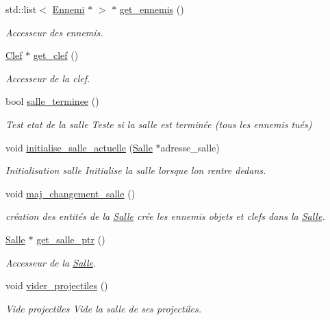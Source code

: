 \begin{DoxyCompactItemize}
std\+::list$<$ \hyperlink{classEnnemi}{Ennemi} $\ast$ $>$ $\ast$ \hyperlink{classGestionSalle_a1f6ba669677c1e7568bf31b0c04b6b56}{get\+\_\+ennemis} ()
\begin{DoxyCompactList}\small\item\em Accesseur des ennemis. \end{DoxyCompactList}\item 
\hyperlink{classClef}{Clef} $\ast$ \hyperlink{classGestionSalle_a319c67470a0e68dee7ae1afd53451d82}{get\+\_\+clef} ()
\begin{DoxyCompactList}\small\item\em Accesseur de la clef. \end{DoxyCompactList}\item 
bool \hyperlink{classGestionSalle_af108e77bf088e66a0031b3a8f8f9aba9}{salle\+\_\+terminee} ()
\begin{DoxyCompactList}\small\item\em Test etat de la salle Teste si la salle est terminée (tous les ennemis tués) \end{DoxyCompactList}\item 
void \hyperlink{classGestionSalle_a90451d453082150e6bc4aacee3185bf1}{initialise\+\_\+salle\+\_\+actuelle} (\hyperlink{classSalle}{Salle} $\ast$adresse\+\_\+salle)
\begin{DoxyCompactList}\small\item\em Initialisation salle Initialise la salle lorsque l\textquotesingle{}on rentre dedans. \end{DoxyCompactList}\item 
void \hyperlink{classGestionSalle_aa6483fffd72836b96019b1c01149cb3d}{maj\+\_\+changement\+\_\+salle} ()
\begin{DoxyCompactList}\small\item\em création des entités de la \hyperlink{classSalle}{Salle} crée les ennemis objets et clefs dans la \hyperlink{classSalle}{Salle}. \end{DoxyCompactList}\item 
\hyperlink{classSalle}{Salle} $\ast$ \hyperlink{classGestionSalle_a956b17a928f170f399e063d730495f4c}{get\+\_\+salle\+\_\+ptr} ()
\begin{DoxyCompactList}\small\item\em Accesseur de la \hyperlink{classSalle}{Salle}. \end{DoxyCompactList}\item 
void \hyperlink{classGestionSalle_a18f9d9f3bceb83a0a2cee570e7936643}{vider\+\_\+projectiles} ()
\begin{DoxyCompactList}\small\item\em Vide projectiles Vide la salle de ses projectiles. \end{DoxyCompactList}\item 

\end{DoxyCompactItemize}
